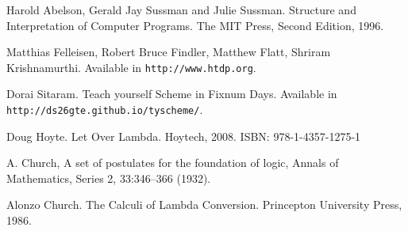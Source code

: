 \documentclass[a4paper,12pt]{book}
\begin{document}
\begin{thebibliography}{99}


 Harold Abelson, Gerald Jay Sussman and
  Julie Sussman. Structure and Interpretation of
  Computer Programs. The MIT Press, Second Edition, 1996.

 Matthias Felleisen,
  Robert Bruce Findler, Matthew Flatt, Shriram Krishnamurthi.
  Available in \verb|http://www.htdp.org|.

 Dorai Sitaram. Teach yourself Scheme
  in Fixnum Days. Available
  in \verb|http://ds26gte.github.io/tyscheme/|.

 Doug Hoyte. Let Over Lambda. Hoytech, 2008. ISBN: 978-1-4357-1275-1

 A. Church, A set of postulates for the foundation of logic, Annals of Mathematics, Series 2, 33:346–366 (1932).

 Alonzo Church. The Calculi of Lambda Conversion. Princepton University Press, 1986.

\end{thebibliography}

\printindex
\end{document}
